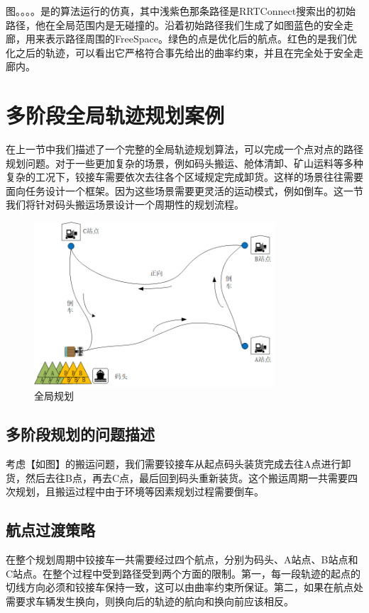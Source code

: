 \documentclass[master,academic]{ysuthesis} %
\begin{document}
		 图。。。。是的算法运行的仿真，其中浅紫色那条路径是RRTConnect搜索出的初始路径，他在全局范围内是无碰撞的。沿着初始路径我们生成了如图蓝色的安全走廊，用来表示路径周围的FreeSpace。绿色的点是优化后的航点。红色的是我们优化之后的轨迹，可以看出它严格符合事先给出的曲率约束，并且在完全处于安全走廊内。
		
	\section{多阶段全局轨迹规划案例}
	在上一节中我们描述了一个完整的全局轨迹规划算法，可以完成一个点对点的路径规划问题。对于一些更加复杂的场景，例如码头搬运、舱体清卸、矿山运料等多种复杂的工况下，铰接车需要依次去往各个区域规定完成卸货。这样的场景往往需要面向任务设计一个框架。因为这些场景需要更灵活的运动模式，例如倒车。这一节我们将针对码头搬运场景设计一个周期性的规划流程。
	\begin{figure}[!ht]
		\centering
		\includegraphics[width=0.8\textwidth]{全局规划.png}
		\caption{全局规划}
		\label{fig:全局规划}
	\end{figure}
		\subsection{多阶段规划的问题描述}
		考虑【如图】的搬运问题，我们需要铰接车从起点码头装货完成去往A点进行卸货，然后去往B点，再去C点，最后回到码头重新装货。这个搬运周期一共需要四次规划，且搬运过程中由于环境等因素规划过程需要倒车。
		\subsection{航点过渡策略}
		在整个规划周期中铰接车一共需要经过四个航点，分别为码头、A站点、B站点和C站点。在整个过程中受到路径受到两个方面的限制。第一，每一段轨迹的起点的切线方向必须和铰接车保持一致，这可以由曲率约束所保证。第二，如果在航点处需要求车辆发生换向，则换向后的轨迹的航向和换向前应该相反。 
		
\end{document}
